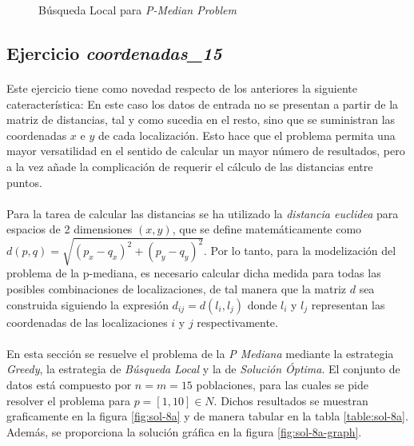 \documentclass[spanish]{article}
\begin{document}
		\begin{figure}[h]
			\centering
			\inputminted{basic}{./code/local-search-p-median-greedy.mos}
			\caption{Búsqueda Local para \emph{P-Median Problem}}
			\label{code:local-search}
		\end{figure}

		\subsection{Ejercicio \emph{coordenadas\_15}}
		\label{sec:e-8a}

			\paragraph{}
			Este ejercicio tiene como novedad respecto de los anteriores la siguiente cateracterística: En este caso los datos de entrada no se presentan a partir de la matriz de distancias, tal y como sucedia en el resto, sino que se suministran las coordenadas $x$ e $y$ de cada localización. Esto hace que el problema permita una mayor versatilidad en el sentido de calcular un mayor número de resultados, pero a la vez añade la complicación de requerir el cálculo de las distancias entre puntos.

			\paragraph{}
			Para la tarea de calcular las distancias se ha utilizado la \emph{distancia euclidea} para espacios de 2 dimensiones $(x,y)$, que se define matemáticamente como $d(p, q) = \sqrt{(p_x - q_x)^2 + (p_y - q_y)^2}$. Por lo tanto, para la modelización del problema de la p-mediana, es necesario calcular dicha medida para todas las posibles combinaciones de localizaciones, de tal manera que la matriz $d$ sea construida siguiendo la expresión $d_{ij} = d(l_i, l_j)$ donde $l_i$ y $l_j$ representan las coordenadas de las localizaciones $i$ y $j$ respectivamente.


			\paragraph{}
			En esta sección se resuelve el problema de la \emph{P Mediana} mediante la estrategia \emph{Greedy}, la estrategia de \emph{Búsqueda Local} y la de \emph{Solución Óptima}. El conjunto de datos está compuesto por $n = m = 15$ poblaciones, para las cuales se pide resolver el problema para $p = [1,10] \in N$. Dichos resultados se muestran graficamente en la figura \ref{fig:sol-8a} y de manera tabular en la tabla \ref{table:sol-8a}. Además, se proporciona la solución gráfica en la figura \ref{fig:sol-8a-graph}.
\end{document}

